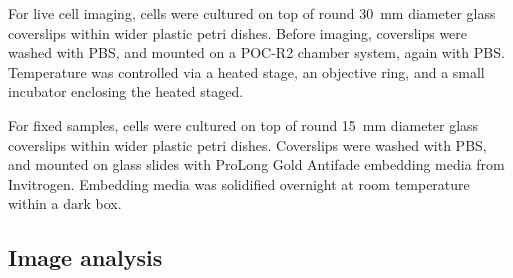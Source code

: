       For live cell imaging, cells were cultured on top of round
      \SI{30}{\mm} diameter glass coverslips within wider
      plastic petri dishes.
      Before imaging, coverslips were washed with PBS, and mounted on
      a POC-R2 chamber system, again with PBS.
      Temperature was controlled via a heated stage, an objective ring,
      and a small incubator enclosing the heated staged.

      For fixed samples, cells were cultured on top of round \SI{15}{\mm}
      diameter glass coverslips within wider plastic petri dishes.
      Coverslips were washed with  PBS, and mounted on glass
      slides with ProLong Gold Antifade embedding media from Invitrogen.
      Embedding media was solidified overnight at room temperature within
      a dark box.

  \subsection{Image analysis}
